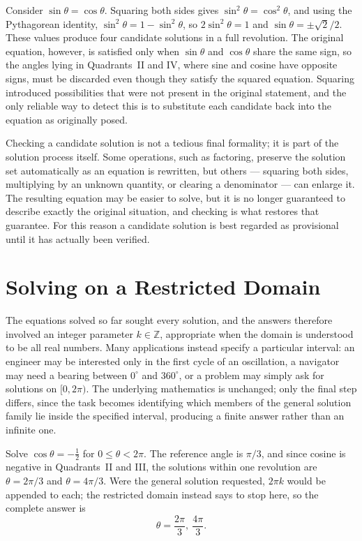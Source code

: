 \begin{example}
Consider $\sin\theta = \cos\theta$. Squaring both sides gives
$\sin^2\theta = \cos^2\theta$, and using the Pythagorean identity,
$\sin^2\theta = 1 - \sin^2\theta$, so $2\sin^2\theta = 1$ and $\sin\theta =
\pm\sqrt2/2$. These values produce four candidate solutions in a full
revolution. The original equation, however, is satisfied only when
$\sin\theta$ and $\cos\theta$ share the same sign, so the angles lying in
Quadrants~II and IV, where sine and cosine have opposite signs, must be
discarded even though they satisfy the squared equation. Squaring
introduced possibilities that were not present in the original statement,
and the only reliable way to detect this is to substitute each candidate
back into the equation as originally posed.
\end{example}

Checking a candidate solution is not a tedious final formality; it is part
of the solution process itself. Some operations, such as factoring,
preserve the solution set automatically as an equation is rewritten, but
others --- squaring both sides, multiplying by an unknown quantity, or
clearing a denominator --- can enlarge it. The resulting equation may be
easier to solve, but it is no longer guaranteed to describe exactly the
original situation, and checking is what restores that guarantee. For this
reason a candidate solution is best regarded as provisional until it has
actually been verified.

\section{Solving on a Restricted Domain}

The equations solved so far sought every solution, and the answers
therefore involved an integer parameter $k \in \mathbb{Z}$, appropriate
when the domain is understood to be all real numbers. Many applications
instead specify a particular interval: an engineer may be interested only
in the first cycle of an oscillation, a navigator may need a bearing
between $0^\circ$ and $360^\circ$, or a problem may simply ask for
solutions on $[0, 2\pi)$. The underlying mathematics is unchanged; only the
final step differs, since the task becomes identifying which members of
the general solution family lie inside the specified interval, producing a
finite answer rather than an infinite one.

\begin{example}
Solve $\cos\theta = -\tfrac12$ for $0 \le \theta < 2\pi$. The reference
angle is $\pi/3$, and since cosine is negative in Quadrants~II and III, the
solutions within one revolution are $\theta = 2\pi/3$ and $\theta =
4\pi/3$. Were the general solution requested, $2\pi k$ would be appended
to each; the restricted domain instead says to stop here, so the complete
answer is
\[
\boxed{\theta = \frac{2\pi}{3},\ \frac{4\pi}{3}.}
\]
\end{example}

